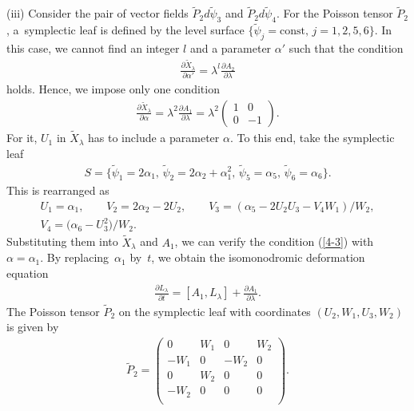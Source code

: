 \documentclass[10pt,a4paper]{amsart}
\numberwithin{equation}{section}
\begin{document}
(iii) Consider the pair of vector f\/ields $\widetilde{P}_2 d\widetilde{\psi}_3$ and $\widetilde{P}_2 d\widetilde{\psi}_4$. For the Poisson tensor $\widetilde{P}_2$, a~symplectic leaf is def\/ined by the level surface $\{ \widetilde{\psi}_j = \text{const},\, j=1,2,5,6\}$. In this case, we cannot f\/ind an integer $l$ and a parameter $\alpha '$ such that the condition
\begin{gather*}
\frac{\partial \widetilde{X}_\lambda }{\partial \alpha'} = \lambda^l \frac{\partial A_2 }{\partial \lambda }
\end{gather*}
holds. Hence, we impose only one condition
\begin{gather}
\frac{\partial \widetilde{X}_\lambda }{\partial \alpha} = \lambda^2 \frac{\partial A_1 }{\partial \lambda } = \lambda^2 \left(
\begin{matrix}
1 & 0 \\
0 & -1
\end{matrix}
\right).
\label{4-3}
\end{gather}
For it, $U_1$ in $\widetilde{X}_\lambda $ has to include a parameter $\alpha $. To this end, take the symplectic leaf
\begin{gather*}
S = \big\{ \widetilde{\psi}_1 = 2\alpha _1,\, \widetilde{\psi}_2 = 2\alpha _2+\alpha _1^2 ,\, \widetilde{\psi}_5 = \alpha _5,\, \widetilde{\psi}_6 = \alpha _6 \big\}.
\end{gather*}
This is rearranged as
\begin{gather*}
U_1 = \alpha _1,\qquad V_2 = 2\alpha _2 - 2U_2,\qquad V_3 = (\alpha _5 - 2U_2U_3 - V_4W_1)/W_2, \\
 V_4 = \big(\alpha _6 - U_3^2\big)/W_2.
\end{gather*}
Substituting them into $\widetilde{X}_\lambda$ and $A_1$, we can verify the condition (\ref{4-3}) with $\alpha = \alpha _1$. By repla\-cing~$\alpha _1$ by~$t$, we obtain the isomonodromic deformation equation
\begin{gather*}
\frac{\partial L_\lambda }{\partial t} = [A_1, L_\lambda ]+ \frac{\partial A_1}{\partial \lambda } .
\end{gather*}
The Poisson tensor $\widetilde{P}_2$ on the symplectic leaf with coordinates $(U_2, W_1 ,U_3, W_2)$ is given by
\begin{gather*}
\widetilde{P}_2 = \left(
\begin{matrix}
0 &W_1 &0 & W_2 \\
-W_1&0 &-W_2 &0 \\
0&W_2 &0 &0 \\
-W_2&0 &0 &0 \\
\end{matrix}
\right).
\end{gather*}
\end{document}
